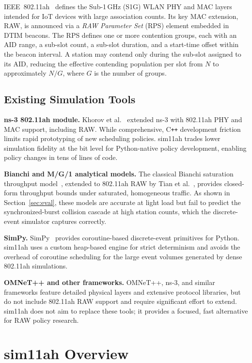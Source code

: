 \documentclass[conference]{IEEEtran}
\begin{document}
IEEE~802.11ah~\cite{std80211ah} defines the Sub-1\,GHz (S1G) WLAN PHY and
MAC layers intended for IoT devices with large association counts.
Its key MAC extension, RAW, is announced via a \emph{RAW Parameter Set} (RPS)
element embedded in DTIM beacons.
The RPS defines one or more contention groups, each with an AID range, a
sub-slot count, a sub-slot duration, and a start-time offset within the beacon
interval.
A station may contend only during the sub-slot assigned to its AID, reducing
the effective contending population per slot from $N$ to approximately $N/G$,
where $G$ is the number of groups.

\subsection{Existing Simulation Tools}

\textbf{ns-3 802.11ah module.}
Khorov et al.~\cite{khorov2015} extended ns-3 with 802.11ah PHY and MAC
support, including RAW.
While comprehensive, C\texttt{++} development friction limits rapid
prototyping of new scheduling policies.
sim11ah trades lower simulation fidelity at the bit level for Python-native
policy development, enabling policy changes in tens of lines of code.

\textbf{Bianchi and M/G/1 analytical models.}
The classical Bianchi saturation throughput model~\cite{bianchi2000},
extended to 802.11ah RAW by Tian et al.~\cite{tian2016}, provides
closed-form throughput bounds under saturated, homogeneous traffic.
As shown in Section~\ref{sec:eval}, these models are accurate at light load
but fail to predict the synchronized-burst collision cascade at high station
counts, which the discrete-event simulator captures correctly.

\textbf{SimPy.}
SimPy~\cite{simpy} provides coroutine-based discrete-event primitives for
Python.
sim11ah uses a custom heap-based engine for strict determinism and avoids
the overhead of coroutine scheduling for the large event volumes generated by
dense 802.11ah simulations.

\textbf{OMNeT++ and other frameworks.}
OMNeT++, ns-3, and similar frameworks feature detailed physical layers and
extensive protocol libraries, but do not include 802.11ah RAW support and
require significant effort to extend.
sim11ah does not aim to replace these tools; it provides a focused, fast
alternative for RAW policy research.

\section{sim11ah Overview}
\label{sec:overview}
\end{document}
